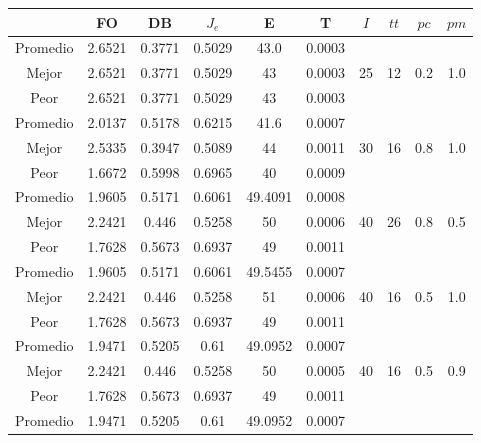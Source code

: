 \begin{table}[h!]
    \footnotesize
    \begin{center}
        \begin{tabular}{|c|c|c|c|c|c|c|c|c|c|}
        \hline
            & {\bf FO} & {\bf DB} & $J_e$ & {\bf E} & {\bf T} & $I$ & $tt$ & $pc$ & $pm$ \\
        \hline
        \hline
            Promedio  & 2.6521 & 0.3771 & 0.5029 & 43.0 & 0.0003 &  &  &  & \\
            \cline{1-6}
            Mejor & 2.6521 & 0.3771  & 0.5029 & 43 & 0.0003 & 25 & 12 & 0.2 & 1.0\\
            \cline{1-6}
            Peor & 2.6521 & 0.3771  & 0.5029 & 43 & 0.0003 &  &  &  & \\
        \hline
        \hline
            Promedio  & 2.0137 & 0.5178 & 0.6215 & 41.6 & 0.0007 &  &  &  & \\
            \cline{1-6}
            Mejor & 2.5335 & 0.3947  & 0.5089 & 44 & 0.0011 & 30 & 16 & 0.8 & 1.0\\
            \cline{1-6}
            Peor & 1.6672 & 0.5998  & 0.6965 & 40 & 0.0009 &  &  &  & \\
        \hline
        \hline
            Promedio  & 1.9605 & 0.5171 & 0.6061 & 49.4091 & 0.0008 &  &  &  & \\
            \cline{1-6}
            Mejor & 2.2421 & 0.446  & 0.5258 & 50 & 0.0006 & 40 & 26 & 0.8 & 0.5\\
            \cline{1-6}
            Peor & 1.7628 & 0.5673  & 0.6937 & 49 & 0.0011 &  &  &  & \\
        \hline
        \hline
            Promedio  & 1.9605 & 0.5171 & 0.6061 & 49.5455 & 0.0007 &  &  &  & \\
            \cline{1-6}
            Mejor & 2.2421 & 0.446  & 0.5258 & 51 & 0.0006 & 40 & 16 & 0.5 & 1.0\\
            \cline{1-6}
            Peor & 1.7628 & 0.5673  & 0.6937 & 49 & 0.0011 &  &  &  & \\
        \hline
        \hline
            Promedio  & 1.9471 & 0.5205 & 0.61 & 49.0952 & 0.0007 &  &  &  & \\
            \cline{1-6}
            Mejor & 2.2421 & 0.446  & 0.5258 & 50 & 0.0005 & 40 & 16 & 0.5 & 0.9\\
            \cline{1-6}
            Peor & 1.7628 & 0.5673  & 0.6937 & 49 & 0.0011 &  &  &  & \\
        \hline
        \hline
            Promedio  & 1.9471 & 0.5205 & 0.61 & 49.0952 & 0.0007 &  &  &  & \\

\end{tabular}
\end{center}
\end{table}
